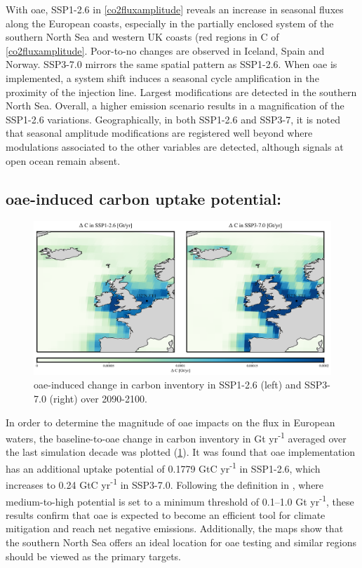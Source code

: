 With \ac{oae}, SSP1-2.6 in \cref{co2fluxamplitude} reveals an increase in  seasonal fluxes along the European coasts, especially in the partially enclosed system of the southern North Sea and western UK coasts (red regions in C of \cref{co2fluxamplitude}. Poor-to-no changes are observed in Iceland, Spain and Norway. SSP3-7.0 mirrors the same spatial pattern as SSP1-2.6. When \ac{oae} is implemented, a system shift induces a seasonal cycle amplification in the proximity of the injection line. Largest modifications are detected in the southern North Sea. Overall, a higher emission scenario results in a magnification of the SSP1-2.6 variations. Geographically, in both SSP1-2.6 and SSP3-7, it is noted that  seasonal amplitude modifications are registered well beyond where modulations associated to the other variables are detected, although signals at open ocean remain absent. 

\subsection[\texorpdfstring{OAE}{OAE}-induced carbon uptake potential:]{\ac{oae}-induced carbon uptake potential:}

\begin{figure}[H]
\caption[\texorpdfstring{OAE}{OAE}-induced change in carbon inventory]{\ac{oae}-induced change in carbon inventory in SSP1-2.6 (left) and SSP3-7.0 (right) over 2090-2100.}
\label{cgt}
\centering
\includegraphics[width=15cm]{fig/3_Results/CO2flux/Cgt.png}

\end{figure}

In order to determine the magnitude of \ac{oae} impacts on the  flux in European waters, the baseline-to-\ac{oae} change in carbon inventory in Gt yr\textsuperscript{-1} averaged over the last simulation decade was plotted (\cref{cgt}). It was found that \ac{oae} implementation has an additional uptake potential of 0.1779 GtC yr\textsuperscript{-1} in SSP1-2.6, which increases to 0.24 GtC yr\textsuperscript{-1} in SSP3-7.0. Following the definition in \cite{NAP26278}, where medium-to-high potential is set to a minimum threshold of 0.1–1.0 Gt  yr\textsuperscript{-1}, these results confirm that \ac{oae} is expected to become an efficient tool for climate mitigation and reach net negative emissions. Additionally, the maps show that the southern North Sea offers an ideal location for \ac{oae} testing and similar regions should be viewed as the primary targets. 


